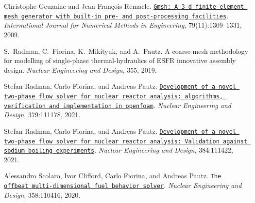 \begin{DoxyDescription}
\item[\label{_CITEREF_https://doi.org/10.1002/nme.2579}%
\mbox{[}7\mbox{]}]Christophe Geuzaine and Jean-\/\+François Remacle. \href{https://onlinelibrary.wiley.com/doi/abs/10.1002/nme.2579}{\tt Gmsh\+: A 3-\/d finite element mesh generator with built-\/in pre-\/ and post-\/processing facilities}. {\itshape International Journal for Numerical Methods in Engineering}, 79(11)\+:1309--1331, 2009. 


\item[\label{_CITEREF_Radman2019ADesign}%
\mbox{[}8\mbox{]}]S.~Radman, C.~Fiorina, K.~Mikityuk, and A.~Pautz. A coarse-\/mesh methodology for modelling of single-\/phase thermal-\/hydraulics of E\+S\+FR innovative assembly design. {\itshape Nuclear Engineering and Design}, 355, 2019. 


\item[\label{_CITEREF_RADMAN2021111178}%
\mbox{[}9\mbox{]}]Stefan Radman, Carlo Fiorina, and Andreas Pautz. \href{https://www.sciencedirect.com/science/article/pii/S0029549321001308}{\tt Development of a novel two-\/phase flow solver for nuclear reactor analysis\+: algorithms, verification and implementation in openfoam}. {\itshape Nuclear Engineering and Design}, 379\+:111178, 2021. 


\item[\label{_CITEREF_RADMAN2021111422}%
\mbox{[}10\mbox{]}]Stefan Radman, Carlo Fiorina, and Andreas Pautz. \href{https://www.sciencedirect.com/science/article/pii/S0029549321003745}{\tt Development of a novel two-\/phase flow solver for nuclear reactor analysis\+: Validation against sodium boiling experiments}. {\itshape Nuclear Engineering and Design}, 384\+:111422, 2021. 


\item[\label{_CITEREF_SCOLARO2020110416}%
\mbox{[}11\mbox{]}]Alessandro Scolaro, Ivor Clifford, Carlo Fiorina, and Andreas Pautz. \href{https://www.sciencedirect.com/science/article/pii/S0029549319304479}{\tt The offbeat multi-\/dimensional fuel behavior solver}. {\itshape Nuclear Engineering and Design}, 358\+:110416, 2020. 


\end{DoxyDescription}